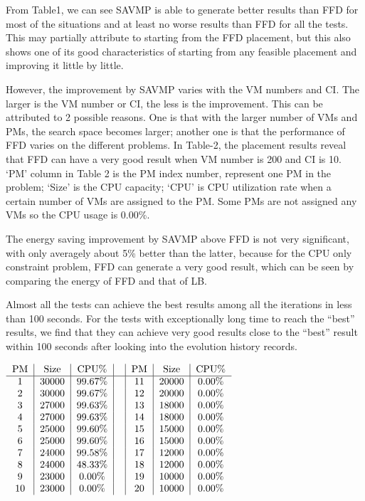 \documentclass[10pt, conference, compsocconf]{IEEEtran}
\begin{document}
From Table1, we can see SAVMP is able to generate better results than FFD for
most of the situations and at least no worse results than FFD for all the tests.
This may partially attribute to starting from the FFD placement, but this also
shows one of its good characteristics of starting from any feasible placement
and improving it little by little.

However, the improvement by SAVMP varies with the VM numbers and CI. The larger
is the VM number or CI, the less is the improvement. This can be attributed to 2
possible reasons. One is that with the larger number of VMs and PMs, the search
space becomes larger; another one is that the performance of FFD varies on the
different problems. In Table-2, the placement results reveal that FFD can have a
very good result when VM number is 200 and CI is 10. `PM' column in Table 2 is
the PM index number, represent one PM in the problem; `Size' is the CPU
capacity; `CPU' is CPU utilization rate when a certain number of VMs are
assigned to the PM. Some PMs are not assigned any VMs so the CPU usage is
0.00\%.

The energy saving improvement by SAVMP above FFD is not very significant, with
only averagely about 5\% better than the latter, because for the CPU only
constraint problem, FFD can generate a very good result, which can be seen by
comparing the energy of FFD and that of LB. 

Almost all the tests can achieve the best results among all the iterations in
less than 100 seconds. For the tests with exceptionally long time to reach the
``best'' results, we find that they can achieve very good results close to
the ``best'' result within 100 seconds after looking into the evolution
history records.


\begin{table}[h]
\begin{center}
\caption{VM placement results by FFD on 200 VMs
 with capacity index = 10}
$\begin{tabular}{c|c|c|c|c|c|c}
PM & Size & CPU\% & & PM & Size & CPU\% \\
\hline
1 & 30000 & 99.67\% & & 11 & 20000 & 0.00\%\\
2 & 30000 & 99.67\% & & 12 & 20000 & 0.00\%\\
3 & 27000 & 99.63\% & & 13 & 18000 & 0.00\%\\
4 & 27000 & 99.63\% & & 14 & 18000 & 0.00\%\\
5 & 25000 & 99.60\% & & 15 & 15000 & 0.00\%\\
6 & 25000 & 99.60\% & & 16 & 15000 & 0.00\%\\
7 & 24000 & 99.58\% & & 17 & 12000 & 0.00\%\\
8 & 24000 & 48.33\% & & 18 & 12000 & 0.00\%\\
9 & 23000 & 0.00\% & & 19 & 10000 & 0.00\%\\
10 & 23000 & 0.00\% & & 20 & 10000 & 0.00\%\\
\end{tabular}$
\end{center}
\end{table}
\end{document}
